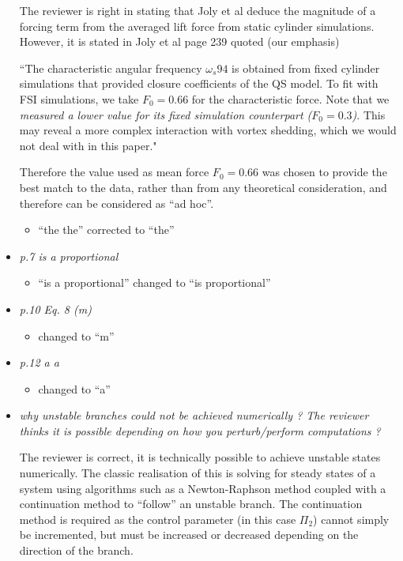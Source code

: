 \documentclass[]{article}
\begin{document}
\begin{itemize}
The reviewer is right in stating that Joly et al deduce the magnitude of a forcing term from the averaged lift force from static cylinder simulations. However, it is stated in Joly et al  page 239 quoted (our emphasis)

``The characteristic angular frequency $\omega_{s}94$ is obtained from fixed cylinder simulations that provided closure coefficients of the QS model. To fit with FSI simulations, we take $F_0=0.66$ for the characteristic force. Note that we \emph{measured a lower value for its fixed simulation counterpart ($F_0=0.3$)}. This may reveal a more complex interaction with vortex shedding, which we would not deal with in this paper."

Therefore the value used as mean force $F_0= 0.66$ was chosen to provide the best match to the data, rather than from any theoretical consideration, and therefore can be considered as “ad hoc”.

\begin{itemize}
\item ``the the'' corrected to ``the''
\end{itemize}


\item \emph{p.7	is	a	proportional}

\begin{itemize}
\item ``is a proportional'' changed to ``is proportional''
\end{itemize}

\item \emph{p.10	Eq.	8	(m)}

\begin{itemize}
\item changed to ``m''
\end{itemize}

\item \emph{p.12 a a}

\begin{itemize}
\item changed to ``a''
\end{itemize}


\item \emph{why	unstable	branches	could	not	be	achieved	numerically	?	The	reviewer	thinks	
	it	is	possible	depending	on	how	you	perturb/perform	computations	?}

The reviewer is correct, it is technically possible to achieve unstable states numerically. The classic realisation of this is solving for steady states of a system using algorithms such as a Newton-Raphson method coupled with a continuation method to “follow” an unstable branch. The continuation method is required as the control parameter (in this case $\Pi_{2}$) cannot simply be incremented, but must be increased or decreased depending on the direction of the branch.


\end{itemize}
\end{document}
